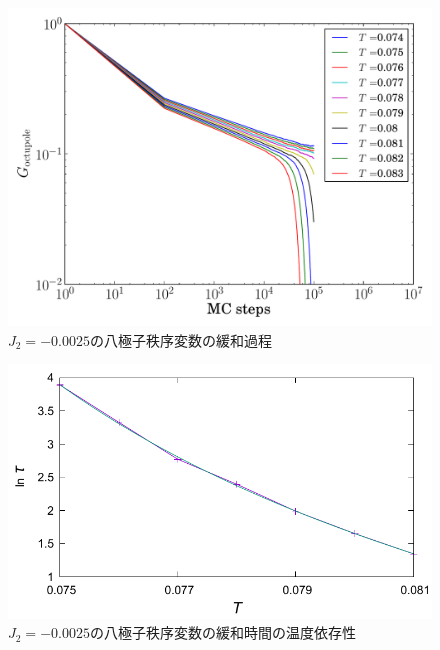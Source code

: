 \documentclass[12pt,titlepage,dvipdfmx]{jarticle}
\begin{document}
\begin{figure}[H]
   \centering
   \includegraphics[width=12cm]{figure/octupole_raw_data_j2_-2.5e-3.pdf}
   \caption{$J_2=-0.0025$の八極子秩序変数の緩和過程}
\end{figure}

\begin{figure}[H]
   \centering
   \includegraphics[width=12cm]{figure/octupole_Tc_j2_-2.5e-3.pdf}
   \caption{$J_2=-0.0025$の八極子秩序変数の緩和時間の温度依存性}
\end{figure}

%
\end{document}
